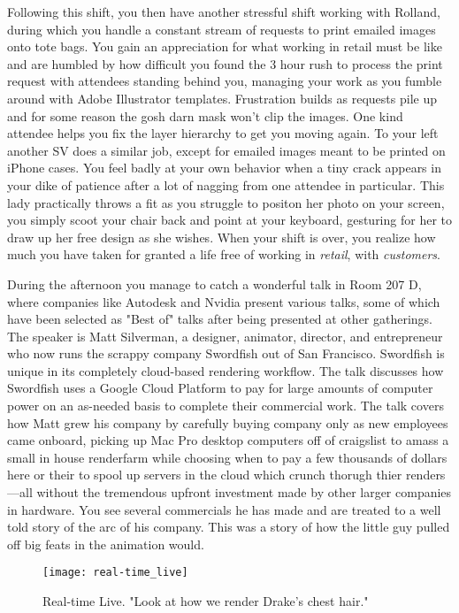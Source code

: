 \documentclass[../main.tex]{subfiles}
\begin{document}
Following this shift, you then have another stressful shift working with Rolland, during which you handle a constant stream of requests to print emailed images onto tote bags. You gain an appreciation for what working in retail must be like and are humbled by how difficult you found the 3 hour rush to process the print request with attendees standing behind you, managing your work as you fumble around with Adobe Illustrator templates. Frustration builds as requests pile up and for some reason the gosh darn mask won't clip the images. One kind attendee helps you fix the layer hierarchy to get you moving again. To your left another SV does a similar job, except for emailed images meant to be printed on iPhone cases. You feel badly at your own behavior when a tiny crack appears in your dike of patience after a lot of nagging from one attendee in particular. This lady practically throws a fit as you struggle to positon her photo on your screen, you simply scoot your chair back and point at your keyboard, gesturing for her to draw up her free design as she wishes. When your shift is over, you realize how much you have taken for granted a life free of working in \textit{retail}, with \textit{customers}.

During the afternoon you manage to catch a wonderful talk in Room 207 D, where companies like Autodesk and Nvidia present various talks, some of which have been selected as "Best of" talks after being presented at other gatherings. The speaker is Matt Silverman, a designer, animator, director, and entrepreneur who now runs the scrappy company Swordfish out of San Francisco. Swordfish is unique in its completely cloud-based rendering workflow. The talk discusses how Swordfish uses a Google Cloud Platform to pay for large amounts of computer power on an as-needed basis to complete their commercial work. The talk covers how Matt grew his company by carefully buying company only as new employees came onboard, picking up Mac Pro desktop computers off of craigslist to amass a small in house renderfarm while choosing when to pay a few thousands of dollars here or their to spool up servers in the cloud which crunch thorugh thier renders---all without the tremendous upfront investment made by other larger companies in hardware. You see several commercials he has made and are treated to a well told story of the arc of his company. This was a story of how the little guy pulled off big feats in the animation would.

\begin{figure}[h!]
	\centering
	\texttt{[image: real-time\_live]}
	\caption*{Real-time Live. "Look at how we render Drake's chest hair."}
\end{figure}
\end{document}

